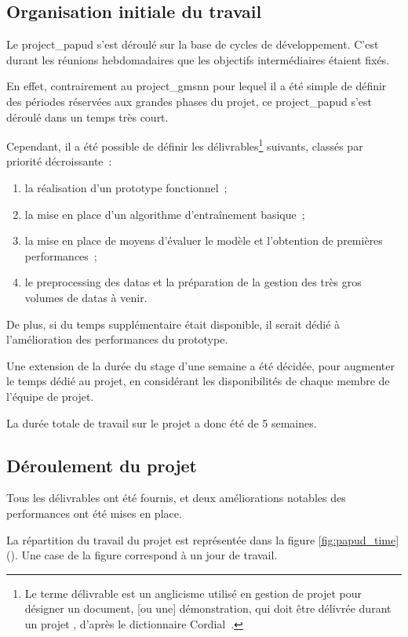 \pagebreak
\subsection{Organisation initiale du travail}
Le \gls{project_papud} s'est déroulé sur la base de cycles de développement.
C'est durant les réunions hebdomadaires que les objectifs intermédiaires étaient fixés.

En effet, contrairement au \gls{project_gmsnn} pour lequel il a été simple de définir des périodes réservées aux grandes phases du projet, ce \gls{project_papud} s'est déroulé dans un temps très court.

Cependant, il a été possible de définir les délivrables\footnote{Le terme \og délivrable \fg{} est un anglicisme utilisé en gestion de projet pour désigner un \og document, [ou une] démonstration, qui doit être délivrée durant un projet \fg, d'après le dictionnaire Cordial~\autocite{delivrable}.} suivants, classés par priorité décroissante~:
\begin{enumerate}
	\item la réalisation d'un prototype fonctionnel~;
	\item la mise en place d'un algorithme d'entraînement basique~;
	\item la mise en place de moyens d'évaluer le modèle et l'obtention de premières performances~;
	\item le \gls{preprocessing} des \glspl{data} et la préparation de la gestion des très gros volumes de \glspl{data} à venir.
\end{enumerate}
\hspace{1em}
%
De plus, si du temps supplémentaire était disponible, il serait dédié à l'amélioration des performances du prototype.

Une extension de la durée du stage d'une semaine a été décidée, pour augmenter le temps dédié au projet, en considérant les disponibilités de chaque membre de l'équipe de projet.

La durée totale de travail sur le projet a donc été de 5 semaines.

\subsection{Déroulement du projet}
Tous les délivrables ont été fournis, et deux améliorations notables des performances ont été mises en place.

La répartition du travail du projet est représentée dans la figure \ref{fig:papud_time} (). Une case de la figure correspond à un jour de travail.

